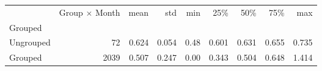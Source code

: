 \begin{tabular}{lrrrrrrrr}
\toprule
{} &  Group $ \times$ Month &   mean &    std &   min &    25\% &    50\% &    75\% &    max \\
Grouped   &                       &        &        &       &        &        &        &        \\
\midrule
Ungrouped &                    72 &  0.624 &  0.054 &  0.48 &  0.601 &  0.631 &  0.655 &  0.735 \\
Grouped   &                  2039 &  0.507 &  0.247 &  0.00 &  0.343 &  0.504 &  0.648 &  1.414 \\
\bottomrule
\end{tabular}
